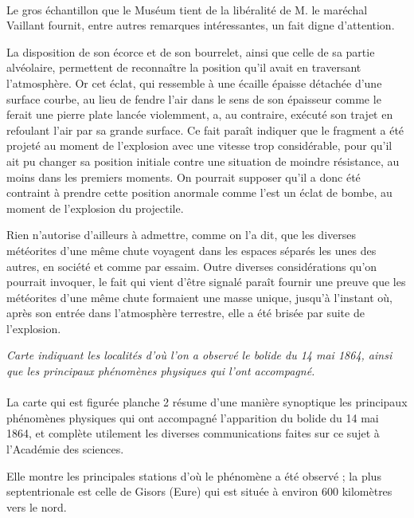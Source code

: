 \documentclass[a4paper, 11pt, oneside, polutonikogreek, french]{article}
\begin{document}
\paragraph{}
Le gros échantillon que le Muséum tient de la libéralité de M. le maréchal Vaillant fournit, entre autres remarques intéressantes, un fait digne d'attention.

La disposition de son écorce et de son bourrelet, ainsi que celle de sa partie alvéolaire, permettent de reconnaître la position qu'il avait en traversant l'atmosphère. Or cet éclat, qui ressemble à une écaille épaisse détachée d'une surface courbe, au lieu de fendre l'air dans le sens de son épaisseur comme le ferait une pierre plate lancée violemment, a, au contraire, exécuté son trajet en refoulant l'air par sa grande surface. Ce fait paraît indiquer que le fragment a été projeté au moment de l'explosion avec une vitesse trop considérable, pour qu'il ait pu changer sa position initiale contre une situation de moindre résistance, au moins dans les premiers moments. On pourrait supposer qu'il a donc été contraint à prendre cette position anormale comme l'est un éclat de bombe, au moment de l'explosion du projectile.

Rien n'autorise d'ailleurs à admettre, comme on l'a dit, que les diverses météorites d'une même chute voyagent dans les espaces séparés les unes des autres, en société et comme par essaim. Outre diverses considérations qu'on pourrait invoquer, le fait qui vient d'être signalé paraît fournir une preuve que les météorites d'une même chute formaient une masse unique, jusqu'à l'instant où, après son entrée dans l'atmosphère terrestre, elle a été brisée par suite de l'explosion.
\begin{center}
\emph{Carte indiquant les localités d'où l'on a observé le bolide du 14 mai 1864, ainsi que les principaux phénomènes physiques qui l'ont accompagné.}
\end{center}
\paragraph{}
La carte qui est figurée planche 2 résume d'une manière synoptique les principaux phénomènes physiques qui ont accompagné l'apparition du bolide du 14 mai 1864, et complète utilement les diverses communications faites sur ce sujet à l'Académie des sciences.

Elle montre les principales stations d'où le phénomène a été observé ; la plus septentrionale est celle de Gisors (Eure) qui est située à environ 600 kilomètres vers le nord.
\end{document}

